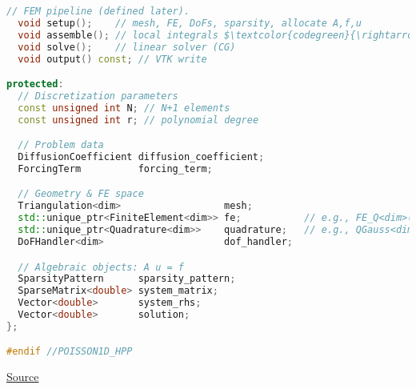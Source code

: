 \begin{lstlisting}[language=C++,mathescape=true]
  // FEM pipeline (defined later).
  void setup();    // mesh, FE, DoFs, sparsity, allocate A,f,u
  void assemble(); // local integrals $\textcolor{codegreen}{\rightarrow}$ global A,f and apply Dirichlet
  void solve();    // linear solver (CG)
  void output() const; // VTK write

protected:
  // Discretization parameters
  const unsigned int N; // N+1 elements
  const unsigned int r; // polynomial degree

  // Problem data
  DiffusionCoefficient diffusion_coefficient;
  ForcingTerm          forcing_term;

  // Geometry & FE space
  Triangulation<dim>                  mesh;
  std::unique_ptr<FiniteElement<dim>> fe;           // e.g., FE_Q<dim>(r)
  std::unique_ptr<Quadrature<dim>>    quadrature;   // e.g., QGauss<dim>(r+1)
  DoFHandler<dim>                     dof_handler;

  // Algebraic objects: A u = f
  SparsityPattern      sparsity_pattern;
  SparseMatrix<double> system_matrix;
  Vector<double>       system_rhs;
  Vector<double>       solution;
};

#endif //POISSON1D_HPP\end{lstlisting}

\begin{center}
    \href{https://gist.github.com/AndreVale69/f04f312da68d16c253f46493ae7eaf24#file-poisson1d-hpp}{ Source}
    \hspace{1em}
\end{center}

